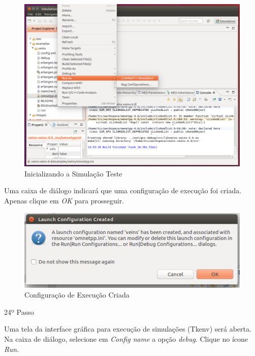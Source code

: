 \documentclass[
12pt,				%
openright,			%
oneside,			%
a4paper,			%
brazil,				%
]{abntex2}
\begin{document}
{\begin{anexosenv}
                \begin{figure} [H]
	                \centering
	                \includegraphics[scale=.35]{figuras/aneB/65SimulacaoTeste}
	                \caption{\label{fig_65}Inicializando a Simulação Teste}
                \end{figure}
                
                \par Uma caixa de diálogo indicará que uma configuração de execução foi criada. Apenas clique em \textit{OK} para prosseguir.
		            
                \begin{figure} [H]
	                \centering
	                \includegraphics[scale=.35]{figuras/aneB/66ConfiguracaoCriada}
	                \caption{\label{fig_66}Configuração de Execução Criada}
                \end{figure}
                    
        	
            	\begin{description}
	                \item[24º Passo]
	            \end{description}
	            \par Uma tela da interface gráfica para execução de simulações (Tkenv) será aberta. Na caixa de diálogo, selecione em \textit{Config name} a opção \textit{debug}. Clique no ícone \textit{Run}.
		            

\end{anexosenv}}
\end{document}
